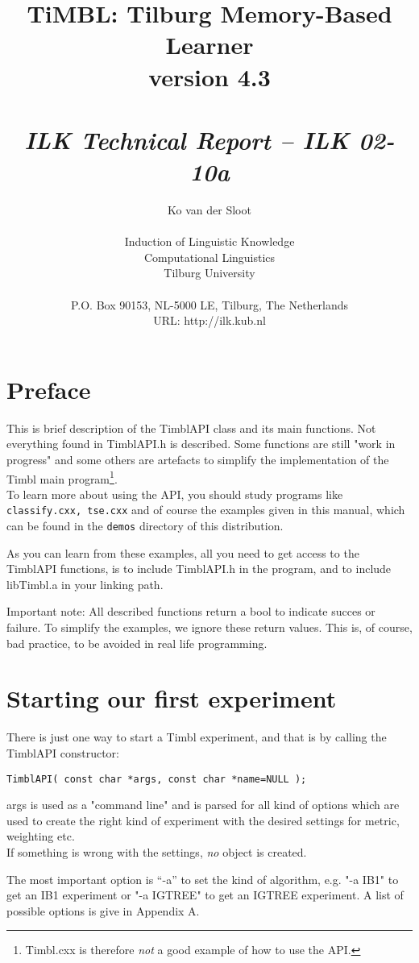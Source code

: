 \documentclass{article}
\author{Ko van der Sloot\\ \ \\ Induction of Linguistic Knowledge\\
        Computational Linguistics\\ Tilburg University \\ \ \\
        P.O. Box 90153, NL-5000 LE, Tilburg, The Netherlands \\ URL:
        http://ilk.kub.nl}
\title{{\huge TiMBL: Tilburg Memory-Based Learner} \\ \vspace*{0.5cm}
{\bf version 4.3} \\ \vspace*{0.5cm}{\huge API Reference Guide}\\
\vspace*{1cm} {\it ILK Technical Report -- ILK 02-10a}}
\begin{document}
\maketitle

\clearpage
\section{Preface}

This is brief description of the TimblAPI class and its main functions.
Not everything found in TimblAPI.h is described. Some functions are
still "work in progress" and some others are artefacts to simplify the
implementation of the Timbl main program\footnote{Timbl.cxx is
therefore {\em not} a good example of how to use the API.}. \\
To learn more about using the API, you should study programs like 
{\tt classify.cxx, tse.cxx} and of course the examples given in this
manual, which can be found in the {\tt demos} directory of this
distribution. 

As you can learn from these examples, all you need to get access to the
TimblAPI functions, is to include TimblAPI.h in the program, and to
include libTimbl.a in your linking path. 

Important note: All described functions return a bool to indicate
succes or failure. To simplify the examples, we ignore these return
values. This is, of course, bad practice, to be avoided in
real life programming.

\section{Starting our first experiment}

There is just one way to start a Timbl experiment, and that is by
calling the TimblAPI constructor:

\begin{verbatim}
TimblAPI( const char *args, const char *name=NULL );
\end{verbatim}

args is used as a "command line" and is parsed for all kind of
options which are used to create the right kind of experiment with the
desired settings for metric, weighting etc.\\
If something is wrong with the settings, {\em no} object is created.

The most important option is ``-a''  to set the kind of algorithm,
e.g. "-a IB1" to get an IB1 experiment or "-a IGTREE" to get an IGTREE
experiment. A list of possible options is give in Appendix A.\\
\end{document}
